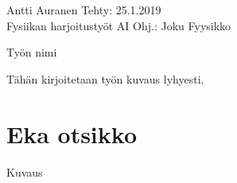 \documentclass[a4paper,12pt]{article}
\begin{document}
\noindent Antti Auranen
\hfill Tehty: 25.1.2019 \\
Fysiikan harjoitustyöt AI \hfill Ohj.: Joku Fyysikko \\

\vspace{1cm}
\begin{center}
\huge{Työn nimi}
\end{center}
\vspace{1.2cm}

\noindent Tähän kirjoitetaan työn kuvaus lyhyesti.

\section{Eka otsikko}

Kuvaus 


\nocite{*}
\printbibliography
\end{document}
